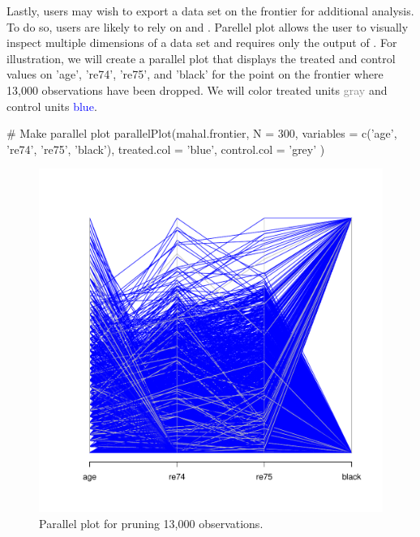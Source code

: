\documentclass[nojss]{jss}
\begin{document}
Lastly, users may wish to export a data set on the frontier for
additional analysis. To do so, users are likely to rely on
 and . Parellel plot
allows the user to visually inspect multiple dimensions of a data set
and requires only the output of . For
illustration, we will create a parallel plot that displays 
the treated and control values on 'age', 're74', 're75', and
'black' for the point on the frontier where 13,000 observations
have been dropped. We will color treated units \textcolor{gray}{gray}
and control units \textcolor{blue}{blue}.

\begin{minipage}{0.45\textwidth}
\begin{CodeChunk}
\begin{CodeInput}
# Make parallel plot
parallelPlot(mahal.frontier,
             N = 300,
             variables = c('age',
             're74',
             're75',
             'black'),
             treated.col = 'blue',
             control.col = 'grey'
             )
\end{CodeInput}
\end{CodeChunk}
\end{minipage}
\begin{minipage}{0.5\textwidth}
\begin{figure}[H]
\includegraphics{mahal_parplot.pdf}
\caption{\label{fig:mahal_parplot} Parallel plot for pruning 13,000 observations.}
\end{figure}
\end{minipage} \hfill
\newline
\newline
\end{document}
